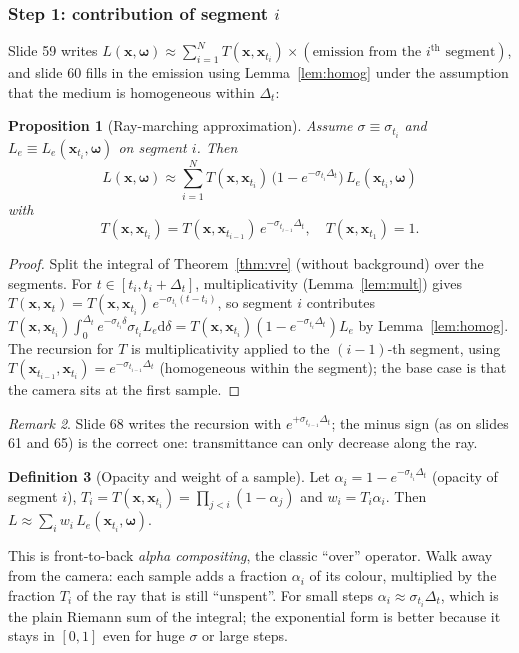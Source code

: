 \documentclass[11pt,a4paper]{article}
\newcommand{\x}{{\bm{x}}}
\newcommand{\w}{{\bm{\omega}}}
\theoremstyle{definition}
\newtheorem{definition}{Definition}[section]
\theoremstyle{plain}
\newtheorem{proposition}[definition]{Proposition}
\theoremstyle{remark}
\newtheorem{remark}[definition]{Remark}
\begin{document}
\subsubsection*{Step 1: contribution of segment $i$}
Slide 59 writes $L(\x,\w)\approx\sum_{i=1}^NT(\x,\x_{t_i})\times(\text{emission from the }i^{\mathrm{th}}\text{ segment})$, and slide 60 fills in the emission using Lemma~\ref{lem:homog} under the assumption that the medium is homogeneous within $\Delta_t$:

\begin{proposition}[Ray-marching approximation]\label{prop:march}
Assume $\sigma\equiv\sigma_{t_i}$ and $L_e\equiv L_e(\x_{t_i},\w)$ on segment $i$. Then
\[
L(\x,\w)\approx\sum_{i=1}^{N}T(\x,\x_{t_i})\,\bigl(1-e^{-\sigma_{t_i}\Delta_t}\bigr)\,L_e(\x_{t_i},\w)
\]
with
\[
T(\x,\x_{t_i})=T(\x,\x_{t_{i-1}})\,e^{-\sigma_{t_{i-1}}\Delta_t},\quad T(\x,\x_{t_1})=1.
\]
\end{proposition}
\begin{proof}
Split the integral of Theorem~\ref{thm:vre} (without background) over the segments. For $t\in[t_i,t_i+\Delta_t]$, multiplicativity (Lemma~\ref{lem:mult}) gives $T(\x,\x_t)=T(\x,\x_{t_i})\,e^{-\sigma_{t_i}(t-t_i)}$, so segment $i$ contributes $T(\x,\x_{t_i})\int_0^{\Delta_t}e^{-\sigma_{t_i}\delta}\sigma_{t_i}L_e\mathrm d\delta=T(\x,\x_{t_i})(1-e^{-\sigma_{t_i}\Delta_t})L_e$ by Lemma~\ref{lem:homog}. The recursion for $T$ is multiplicativity applied to the $(i-1)$-th segment, using $T(\x_{t_{i-1}},\x_{t_i})=e^{-\sigma_{t_{i-1}}\Delta_t}$ (homogeneous within the segment); the base case is that the camera sits at the first sample.
\end{proof}

\begin{remark}
Slide 68 writes the recursion with $e^{+\sigma_{t_{i-1}}\Delta_t}$; the minus sign (as on slides 61 and 65) is the correct one: transmittance can only decrease along the ray.
\end{remark}

\begin{definition}[Opacity and weight of a sample]\label{def:alpha}
Let $\alpha_i=1-e^{-\sigma_{t_i}\Delta_t}$ (opacity of segment $i$), $T_i=T(\x,\x_{t_i})=\prod_{j<i}(1-\alpha_j)$ and $w_i=T_i\alpha_i$. Then $L\approx\sum_iw_i\,L_e(\x_{t_i},\w)$.
\end{definition}

\begin{intuition}
This is front-to-back \emph{alpha compositing}, the classic ``over'' operator. Walk away from the camera: each sample adds a fraction $\alpha_i$ of its colour, multiplied by the fraction $T_i$ of the ray that is still ``unspent''. For small steps $\alpha_i\approx\sigma_{t_i}\Delta_t$, which is the plain Riemann sum of the integral; the exponential form is better because it stays in $[0,1]$ even for huge $\sigma$ or large steps.
\end{intuition}
\end{document}
